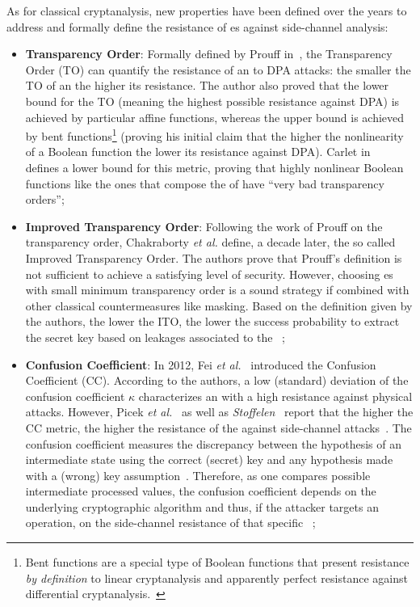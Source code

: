         As for classical cryptanalysis, new properties have been defined over the years to address and formally define the resistance of \sbocs{}es against side-channel analysis:

        \begin{itemize}
            \item \textbf{Transparency Order}: Formally defined by Prouff in~\cite{prouff2005dpa}, the Transparency Order (TO) can quantify the resistance of an \sbocs{} to DPA attacks: the smaller the TO of an \sbocs{} the higher its resistance. The author also proved that the lower bound for the TO (meaning the highest possible resistance against DPA) is achieved by particular affine functions, whereas the upper bound is achieved by bent functions\footnote{Bent functions are a special type of Boolean functions that present resistance \emph{by definition} to linear cryptanalysis and apparently perfect resistance against differential cryptanalysis.~\cite{wikibent}} (proving his initial claim that the higher the nonlinearity of a Boolean function the lower its resistance against DPA). Carlet in ~\cite{carlet2005highly} defines a lower bound for this metric, proving that highly nonlinear Boolean functions like the ones that compose the \sbocs{} of \aes{} have ``very bad transparency orders'';
            
            \item \textbf{Improved Transparency Order}: Following the work of Prouff on the transparency order, Chakraborty \emph{et al.} define, a decade later, the so called Improved Transparency Order. The authors prove that Prouff's definition is not sufficient to achieve a satisfying level of security. However, choosing \sbocs{}es with small minimum transparency order is a sound strategy if combined with other classical countermeasures like masking. Based on the definition given by the authors, the lower the ITO, the lower the success probability to extract the secret key based on leakages associated to the \sbocs{}~\cite{chakraborty2017redefining};

            \item \textbf{Confusion Coefficient}: In 2012, Fei \emph{et al.}~\cite{fei2015statistics} introduced the Confusion Coefficient (CC). According to the authors, a low (standard) deviation of the confusion coefficient $\kappa$ characterizes an \sbocs{} with a high resistance against physical attacks. However, Picek \emph{et al.}~\cite{picek2014confused} as well as \emph{Stoffelen}~\cite{stoffelen2015intrinsic} report that the higher the CC metric, the higher the resistance of the \sbocs{} against side-channel attacks~\cite{lerman2016comparing}. The confusion coefficient measures the discrepancy between the hypothesis of an intermediate state using the correct (secret) key and any hypothesis made with a (wrong) key assumption~\cite{carlet2017trade}. Therefore, as one compares possible intermediate processed values, the confusion coefficient depends on the underlying cryptographic algorithm and thus, if the attacker targets an \sbocs{} operation, on the side-channel resistance of that specific \sbocs{}~\cite{carlet2017trade};
            

\end{itemize}

